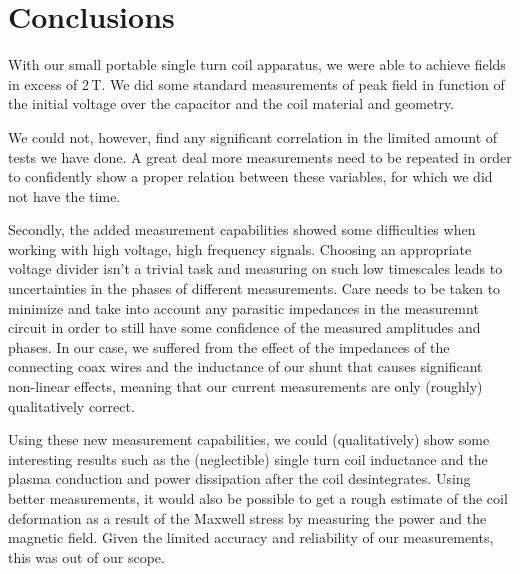 \section{Conclusions}
With our small portable single turn coil apparatus, we were able to achieve 
fields in excess of 2\,T. We did some standard measurements of peak field 
in function of the initial voltage over the capacitor and the coil material 
and geometry.

We could not, however, find any significant correlation in the limited 
amount of tests we have done. A great deal more measurements need to be 
repeated in order to confidently show a proper relation between these 
variables, for which we did not have the time.

Secondly, the added measurement capabilities showed some difficulties when 
working with high voltage, high frequency signals. Choosing an appropriate 
voltage divider isn't a trivial task and measuring on such low timescales 
leads to uncertainties in the phases of different measurements. Care needs 
to be taken to minimize and take into account any parasitic impedances in 
the measuremnt circuit in order to still have some confidence of the 
measured amplitudes and phases. In our case, we suffered from the effect of 
the impedances of the connecting coax wires and the inductance of our shunt 
that causes significant non-linear effects, meaning that our current 
measurements are only (roughly) qualitatively correct.

Using these new measurement capabilities, we could (qualitatively) show 
some interesting results such as the (neglectible) single turn coil 
inductance and the plasma conduction and power dissipation after the coil 
desintegrates. Using better measurements, it would also be possible to get 
a rough estimate of the coil deformation as a result of the Maxwell stress by 
measuring the power and the magnetic field. Given the limited accuracy and 
reliability of our measurements, this was out of our scope.

